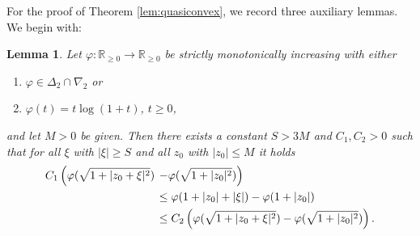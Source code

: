 \documentclass[a4paper,11pt]{amsart}
\numberwithin{equation}{section}
\newcommand{\R}{\mathbb{R}}
\newtheorem{lemma}[defi]{Lemma}
\begin{document}
	For the proof of Theorem \ref{lem:quasiconvex}, we record three auxiliary lemmas. We begin with: 
	\begin{lemma} \label{lem:aux1}
		Let $\varphi: \R_{\geq 0} \to \R_{\geq 0}$ be strictly monotonically increasing with either 
		\begin{enumerate}
			\item  $\varphi \in \Delta_2 \cap \nabla_2$ or
			\item $\varphi(t)=t\log(1+t)$, $t\geq 0$, 
		\end{enumerate} 
		and let $M>0$ be given. 
		Then there exists a  constant $S>3M$ and $C_1,C_2>0$ such that for all $\xi$ with $|\xi|\geq S$ and all $z_0$ with $|z_0| \leq M$ it holds 
		\begin{align}
			C_1 \left( \varphi(\sqrt{1+|z_0+\xi|^2}) \right.&\left. - \varphi(\sqrt{1+|z_0|^2}) \right) \notag \\ & \leq \varphi(1+|z_0|+|\xi|) - \varphi(1+|z_0|) \label{eq:aux1.1} \\
			& \leq C_2 \left( \varphi(\sqrt{1+|z_0+\xi|^2}) - \varphi(\sqrt{1+|z_0|^2}) \right). \label{eq:aux1.2}
		\end{align}
	\end{lemma}
\end{document}
